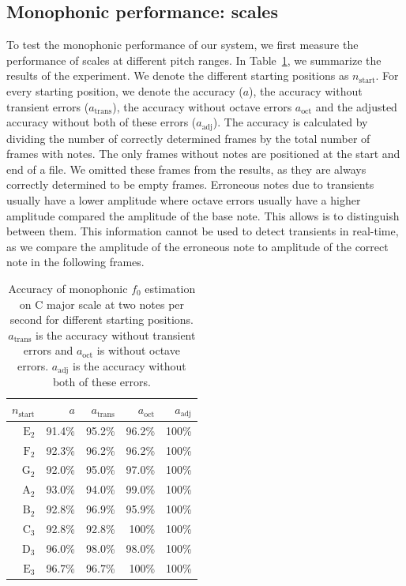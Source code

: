 \documentclass[10pt,twocolumn]{article}
\begin{document}
\subsection{Monophonic performance: scales}
To test the monophonic performance of our system, we first measure the performance of scales at different pitch ranges. In Table~\ref{tab:monperf}, we summarize the results of the experiment. We denote the different starting positions as $n_\text{start}$. For every starting position, we denote the accuracy ($a$), the accuracy without transient errors ($a_\text{trans}$), the accuracy without octave errors $a_\text{oct}$ and the adjusted accuracy without both of these errors ($a_\text{adj}$). The accuracy is calculated by dividing the number of correctly determined frames by the total number of frames with notes. The only frames without notes are positioned at the start and end of a file. We omitted these frames from the results, as they are always correctly determined to be empty frames. Erroneous notes due to transients usually have a lower amplitude where octave errors usually have a higher amplitude compared the amplitude of the base note. This allows is to distinguish between them. This information cannot be used to detect transients in real-time, as we compare the amplitude of the erroneous note to amplitude of the correct note in the following frames.
\begin{table}[H]\vspace{-3mm}
    \centering
    \begin{tabular}{r|rrrr}
        $n_\text{start}$ & $a$ & $a_\text{trans}$ & $a_\text{oct}$ & $a_\text{adj}$ \\
        \hline
        $\text{E}_2$ & 91.4\% & 95.2\% & 96.2\% & 100\% \\
        $\text{F}_2$ & 92.3\% & 96.2\% & 96.2\% & 100\% \\
        $\text{G}_2$ & 92.0\% & 95.0\% & 97.0\% & 100\% \\
        $\text{A}_2$ & 93.0\% & 94.0\% & 99.0\% & 100\% \\
        $\text{B}_2$ & 92.8\% & 96.9\% & 95.9\% & 100\% \\
        $\text{C}_3$ & 92.8\% & 92.8\% & 100\%  & 100\% \\
        $\text{D}_3$ & 96.0\% & 98.0\% & 98.0\% & 100\% \\
        $\text{E}_3$ & 96.7\% & 96.7\% & 100\%  & 100\%
    \end{tabular}
    \caption{Accuracy of monophonic $f_0$ estimation on C major scale at two notes per second for different starting positions. $a_\text{trans}$ is the accuracy without transient errors and $a_\text{oct}$ is without octave errors. $a_\text{adj}$ is the accuracy without both of these errors.}
    \label{tab:monperf}
\end{table}\vspace{-3mm}
\end{document}
